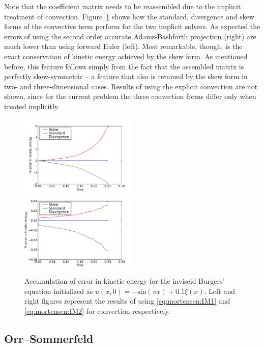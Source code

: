 Note that the coefficient matrix  needs to be reassembled due
to the implicit treatment of convection. Figure~\ref{fig:mortensen:burgers_KE} shows how the standard, divergence and
skew forms of the convective term perform for the two implicit
solvers. As expected the errors of using the second order accurate
Adams-Bashforth projection (right) are much lower than using forward
Euler (left). Most remarkable, though, is the exact conservation of
kinetic energy achieved by the skew form. As mentioned before, this
feature follows simply from the fact that the assembled matrix 
is perfectly skew-symmetric -- a feature that also is retained by the
skew form in two- and three-dimensional cases. Results of using the
explicit convection are not shown, since for the current problem the
three convection forms differ only when treated implicitly.

\begin{figure}
 \includegraphics[width=0.5\textwidth]{chapters/mortensen/pdf/Burgers_KE_IM1.pdf}
 \includegraphics[width=0.5\textwidth]{chapters/mortensen/pdf/Burgers_KE_IM2.pdf}
 \caption{ Accumulation of error in kinetic energy for the inviscid
   Burgers' equation initialized as $u(x,0)=-\text{sin}(\pi x)+0.1
   \xi(x)$. Left and right figures represent the results of using
   \eqref{eq:mortensen:IM1} and \eqref{eq:mortensen:IM2} for
   convection respectively.  }
\label{fig:mortensen:burgers_KE}
\end{figure}

\subsection{Orr--Sommerfeld}
\label{sec:mortensen:OS}

